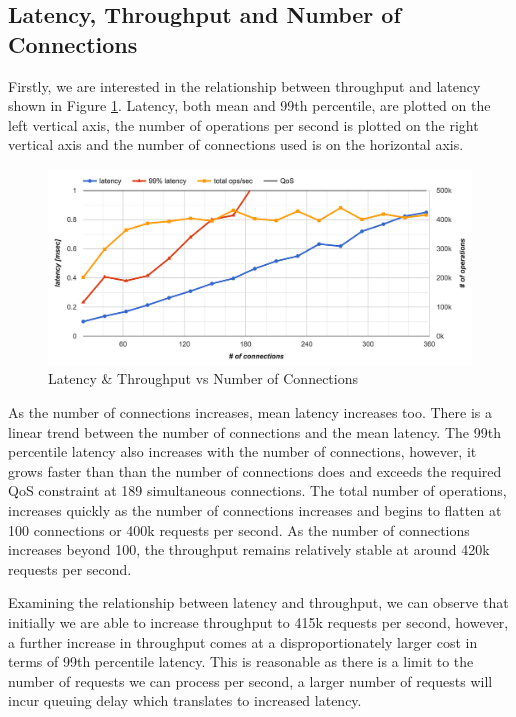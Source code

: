 \subsection{Latency, Throughput and Number of Connections}

Firstly, we are interested in the relationship between throughput and latency shown in Figure \ref{fig:memcached-default-latency-vs-ops}. Latency, both mean and 99th percentile, are plotted on the left vertical axis, the number of operations per second is plotted on the right vertical axis and the number of connections used is on the horizontal axis.

\begin{figure}[h]
    \includegraphics[width=\textwidth]{./res2/m_baseline_latency.png}
    \caption{Latency \& Throughput vs Number of Connections}
    \label{fig:memcached-default-latency-vs-ops}
\end{figure}

As the number of connections increases, mean latency increases too. There is a linear trend between the number of connections and the mean latency. The 99th percentile latency also increases with the number of connections, however, it grows faster than than the number of connections does and exceeds the required QoS constraint at 189 simultaneous connections. The total number of operations, increases quickly as the number of connections increases and begins to flatten at 100 connections or 400k requests per second. As the number of connections increases beyond 100, the throughput remains relatively stable at around 420k requests per second.

Examining the relationship between latency and throughput, we can observe that initially we are able to increase throughput to 415k requests per second, however, a further increase in throughput comes at a disproportionately larger cost in terms of 99th percentile latency. This is reasonable as there is a limit to the number of requests we can process per second, a larger number of requests will incur queuing delay which translates to increased latency.

